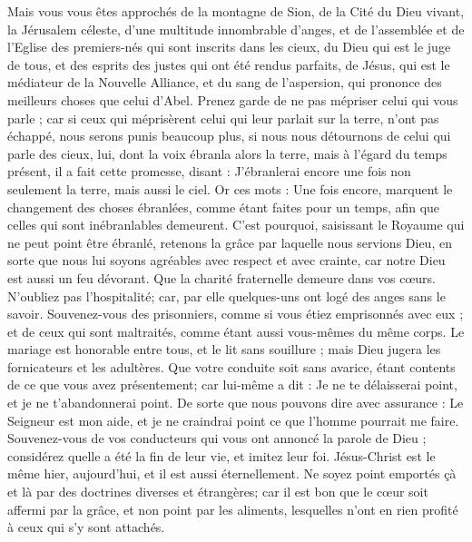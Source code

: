 \begin{multicols}{2}
Mais vous vous êtes approchés de la montagne de Sion, de la Cité du Dieu vivant, la Jérusalem céleste, d'une multitude innombrable d'anges,
et de l'assemblée et de l'Eglise des premiers-nés qui sont inscrits dans les cieux, du Dieu qui est le juge de tous, et des esprits des justes qui ont été rendus parfaits,
de Jésus, qui est le médiateur de la Nouvelle Alliance, et du sang de l'aspersion, qui prononce des meilleurs choses que celui d'Abel.
Prenez garde de ne pas mépriser celui qui vous parle ; car si ceux qui méprisèrent celui qui leur parlait sur la terre, n'ont pas échappé, nous serons punis beaucoup plus, si nous nous détournons de celui qui parle des cieux,
lui, dont la voix ébranla alors la terre, mais à l'égard du temps présent, il a fait cette promesse, disant : J'ébranlerai encore une fois non seulement la terre, mais aussi le ciel.
Or ces mots : Une fois encore, marquent le changement des choses ébranlées, comme étant faites pour un temps, afin que celles qui sont inébranlables demeurent.
C'est pourquoi, saisissant le Royaume qui ne peut point être ébranlé, retenons la grâce par laquelle nous servions Dieu, en sorte que nous lui soyons agréables avec respect et avec crainte,
car notre Dieu est aussi un feu dévorant.
\VerseOne{}Que la charité fraternelle demeure dans vos cœurs.
N'oubliez pas l'hospitalité; car, par elle quelques-uns ont logé des anges sans le savoir.
Souvenez-vous des prisonniers, comme si vous étiez emprisonnés avec eux ; et de ceux qui sont maltraités, comme étant aussi vous-mêmes du même corps.
Le mariage est honorable entre tous, et le lit sans souillure ; mais Dieu jugera les fornicateurs et les adultères.
Que votre conduite soit sans avarice, étant contents de ce que vous avez présentement; car lui-même a dit : Je ne te délaisserai point, et je ne t'abandonnerai point.
De sorte que nous pouvons dire avec assurance : Le Seigneur est mon aide, et je ne craindrai point ce que l'homme pourrait me faire.
Souvenez-vous de vos conducteurs qui vous ont annoncé la parole de Dieu ; considérez quelle a été la fin de leur vie, et imitez leur foi.
Jésus-Christ est le même hier, aujourd'hui, et il est aussi éternellement.
Ne soyez point emportés çà et là par des doctrines diverses et étrangères; car il est bon que le cœur soit affermi par la grâce, et non point par les aliments, lesquelles n'ont en rien profité à ceux qui s'y sont attachés.

\end{multicols}
